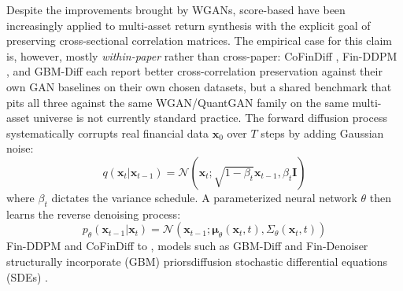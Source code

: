 Despite the improvements brought by WGANs, score-based have been increasingly applied to multi-asset return synthesis with the explicit goal of preserving cross-sectional correlation matrices. The empirical case for this claim is, however, mostly \emph{within-paper} rather than cross-paper: CoFinDiff \citep{tanaka2025cofindiff}, Fin-DDPM \citep{takahashi2024generation}, and GBM-Diff \citep{kim2025gbm} each report better cross-correlation preservation against their own GAN baselines on their own chosen datasets, but a shared benchmark that pits all three against the same WGAN/QuantGAN family on the same multi-asset universe is not currently standard practice. The forward diffusion process systematically corrupts real financial data $\mathbf{x}_0$ over $T$ steps by adding Gaussian noise:
\begin{equation}
q(\mathbf{x}_t | \mathbf{x}_{t-1}) = \mathcal{N}(\mathbf{x}_t; \sqrt{1 - \beta_t}\mathbf{x}_{t-1}, \beta_t \mathbf{I})
\end{equation}
where $\beta_t$ dictates the variance schedule. A parameterized neural network $\theta$ then learns the reverse denoising process:
\begin{equation}
p_\theta(\mathbf{x}_{t-1} | \mathbf{x}_t) = \mathcal{N}(\mathbf{x}_{t-1}; \boldsymbol{\mu}_\theta(\mathbf{x}_t, t), \Sigma_\theta(\mathbf{x}_t, t))
\end{equation}
Fin-DDPM and CoFinDiff \citep{takahashi2024generation, tanaka2025cofindiff} to , models such as GBM-Diff and Fin-Denoiser \citep{kim2025gbm, wang2024denoiser} structurally incorporate (GBM) priorsdiffusion stochastic differential equations (SDEs) .

